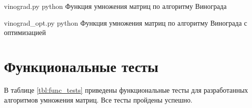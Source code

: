 \clearpage

{vinograd.py} %
{python} %
{Функция умножения матриц по алгоритму Винограда} %

\clearpage

{vinograd_opt.py} %
{python} %
{Функция умножения матриц по алгоритму Винограда с оптимизацией} %

\clearpage

\section{Функциональные тесты}

В таблице \ref{tbl:func_tests} приведены функциональные тесты для разработанных алгоритмов умножения матриц. Все тесты пройдены успешно.

